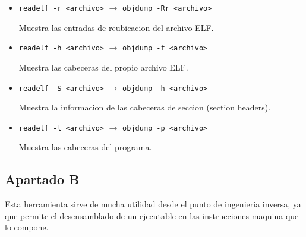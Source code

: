 \documentclass{article}
\begin{document}
\begin{itemize}
    \item \verb|readelf -r <archivo>| $\rightarrow$ \verb|objdump -Rr <archivo>|
    
    
    Muestra las entradas de reubicacion del archivo ELF.


    \item \verb|readelf -h <archivo>| $\rightarrow$ \verb|objdump -f <archivo>|
    
    Muestra las cabeceras del propio archivo ELF.


    \item \verb|readelf -S <archivo>| $\rightarrow$ \verb|objdump -h <archivo>|
    
    Muestra la informacion de las cabeceras de seccion (section headers).


    \item \verb|readelf -l <archivo>| $\rightarrow$ \verb|objdump -p <archivo>|
    
    Muestra las cabeceras del programa.


\end{itemize}


\subsection*{Apartado B}

Esta herramienta sirve de mucha utilidad desde el punto de ingenieria inversa, ya que permite el desensamblado de un ejecutable en las instrucciones maquina que lo compone.


\end{document}
